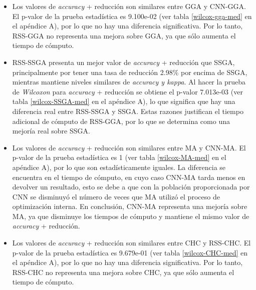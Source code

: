 \begin{itemize}
 
\item  Los valores de \emph{accuracy} + reducción son similares entre GGA y CNN-GGA. El p-valor de la prueba estadística es 9.100e-02 (ver tabla \ref{wilcox-gga-med} en el apéndice A), por lo que no hay una diferencia significativa. Por lo tanto, RSS-GGA no representa una mejora sobre GGA, ya que sólo aumenta el tiempo de cómputo.

\item RSS-SSGA presenta un mejor valor de \emph{accuracy} + reducción que SSGA, principalmente por tener una tasa de reducción 2.98\% por encima de SSGA, mientras mantiene niveles similares de \emph{accuracy y kappa}. Al hacer la prueba de \emph{Wilcoxon} para \emph{accuracy} + reducción se obtiene el p-valor 7.013e-03 (ver tabla \ref{wilcox-SSGA-med} en el apéndice A), lo que significa que hay una diferencia real entre RSS-SSGA y SSGA. Estas razones justifican el tiempo adicional de cómputo de RSS-GGA, por lo que se determina como una mejoría real sobre SSGA.

\item Los valores de \emph{accuracy} + reducción son similares entre MA y CNN-MA. El p-valor de la prueba estadística es 1 (ver tabla \ref{wilcox-MA-med} en el apéndice A), por lo que son estadísticamente iguales. La diferencia se encuentra en el tiempo de cómputo, en cuyo caso CNN-MA tarda menos en devolver un resultado, esto se debe a que con la población proporcionada por CNN se disminuyó el número de veces que MA utilizó el proceso de optimización interna. En conclusión, CNN-MA representa una mejoría sobre MA, ya que disminuye los tiempos de cómputo y mantiene el mismo valor de \emph{accuracy} + reducción.

\item  Los valores de \emph{accuracy} + reducción son similares entre CHC y RSS-CHC. El p-valor de la prueba estadística es 9.679e-01 (ver tabla \ref{wilcox-CHC-med} en el apéndice A), por lo que no hay una diferencia significativa. Por lo tanto, RSS-CHC no representa una mejora sobre CHC, ya que sólo aumenta el tiempo de cómputo.

\end{itemize}

